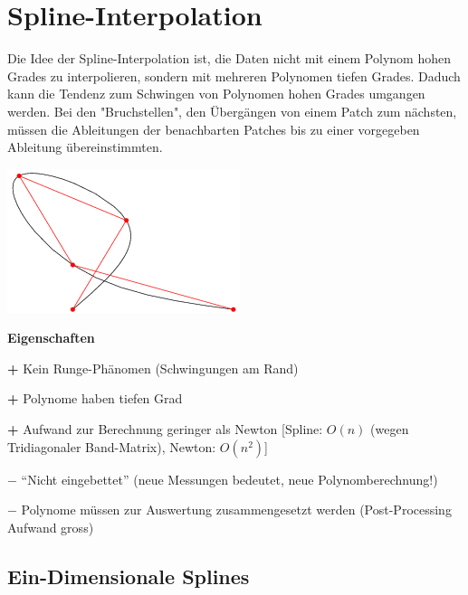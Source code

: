 \section{Spline-Interpolation}

\begin{minipage}[c]{14.5cm}
Die Idee der Spline-Interpolation ist, die Daten nicht mit einem Polynom hohen Grades zu interpolieren, sondern mit mehreren Polynomen tiefen Grades. Daduch kann die Tendenz  zum Schwingen von Polynomen hohen Grades umgangen werden. Bei den "Bruchstellen", den Übergängen von einem Patch zum nächsten, müssen die Ableitungen der benachbarten Patches bis zu einer vorgegeben Ableitung übereinstimmten.
\end{minipage}
\hfill
\begin{minipage}[c]{4cm}
\includegraphics[width=\textwidth]{bilder/kubikSpline}
\end{minipage}

\textbf{Eigenschaften}
\begin{liste}
  \item[\textbf{+}] Kein Runge-Phänomen (Schwingungen am Rand)
  \item[\textbf{+}] Polynome haben tiefen Grad
  \item[\textbf{+}] Aufwand zur Berechnung geringer als Newton [Spline: $O(n)$ (wegen Tridiagonaler Band-Matrix), Newton: $O(n^2)$]  
  \item[$\mathbf{-}$] "`Nicht eingebettet"' (neue Messungen bedeutet, neue Polynomberechnung!)
  \item[$\mathbf{-}$] Polynome müssen zur Auswertung zusammengesetzt werden (Post-Processing Aufwand gross)
\end{liste}


\subsection{Ein-Dimensionale Splines}
